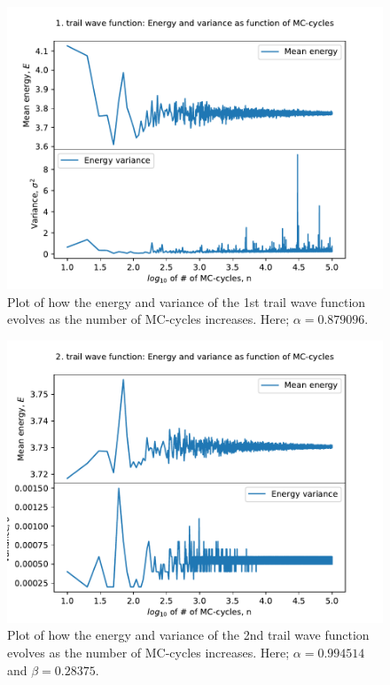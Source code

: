 \documentclass[12pt,english,a4paper]{article}
\begin{document}
\begin{figure}[H]
    \centering
    \includegraphics[scale=0.7]{../figures/plot_stability_trail_1.pdf}
    \caption{Plot of how the energy and variance of the 1st trail wave function evolves as the number of MC-cycles increases. Here; $\alpha=0.879096$.}
    \label{fig:stability_1}
\end{figure}
\begin{figure}[H]
    \centering
    \includegraphics[scale=0.7]{../figures/plot_stability_trail_2.pdf}
    \caption{Plot of how the energy and variance of the 2nd trail wave function evolves as the number of MC-cycles increases. Here; $\alpha=0.994514$ and $\beta=0.28375$.}
    \label{fig:stability_2}
\end{figure}
\end{document}
